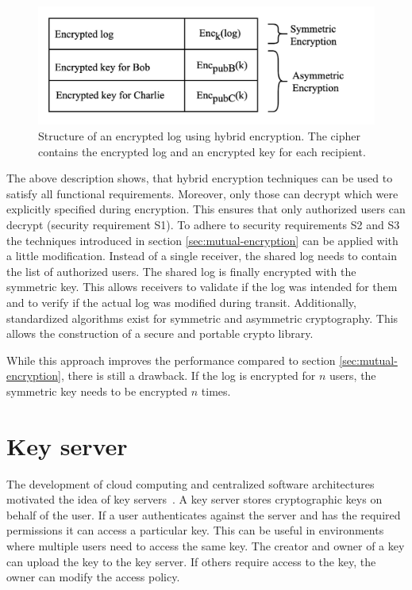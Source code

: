 \documentclass[../main.tex]{subfiles}
\begin{document}
\begin{figure}[ht]
    \includegraphics[scale=0.22]{../img/04/hybrid_encryption.jpg}
    \centering
    \caption{Structure of an encrypted log using hybrid encryption. The cipher contains the encrypted log and an encrypted key for each recipient.}
    \label{fig:hybrid_encryption}
\end{figure}

The above description shows, that hybrid encryption techniques can be used to satisfy all functional requirements.
Moreover, only those can decrypt which were explicitly specified during encryption.
This ensures that only authorized users can decrypt (security requirement S1).
To adhere to security requirements S2 and S3 the techniques introduced in section \ref{sec:mutual-encryption} can be applied with a little modification.
Instead of a single receiver, the shared log needs to contain the list of authorized users.
The shared log is finally encrypted with the symmetric key.
This allows receivers to validate if the log was intended for them and to verify if the actual log was modified during transit.
Additionally, standardized algorithms exist for symmetric and asymmetric cryptography.
This allows the construction of a secure and portable crypto library.

While this approach improves the performance compared to section \ref{sec:mutual-encryption}, there is still a drawback.
If the log is encrypted for $n$ users, the symmetric key needs to be encrypted $n$ times.

\section{Key server}
\label{sec:key-server}

The development of cloud computing and centralized software architectures motivated the idea of key servers~\cite{Seitz2003}.
A key server stores cryptographic keys on behalf of the user.
If a user authenticates against the server and has the required permissions it can access a particular key.
This can be useful in environments where multiple users need to access the same key.
The creator and owner of a key can upload the key to the key server.
If others require access to the key, the owner can modify the access policy.
\end{document}
